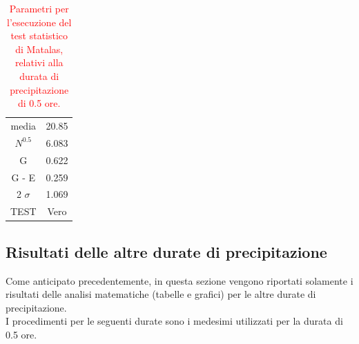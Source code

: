 \begin{table}[H] \centering
    \caption{\textcolor{red}{Parametri per l'esecuzione del test statistico di Matalas, relativi alla durata di precipitazione di 0.5 ore.}}
    \begin{tabular}{cc}
    \toprule
    media                  & 20.85 \\
    $N ^{0.5}$ & 6.083 \\
    G                      & 0.622 \\
    G - E                  & 0.259 \\
    2 $\sigma$             & 1.069 \\
    TEST                   & Vero \\
    \bottomrule
    \end{tabular}
\end{table}

\subsection{Risultati delle altre durate di precipitazione}
Come anticipato precedentemente, in questa sezione vengono riportati solamente i risultati delle analisi matematiche (tabelle e grafici) per le altre durate di precipitazione.\\
I procedimenti per le seguenti durate sono i medesimi utilizzati per la durata di 0.5 ore.
